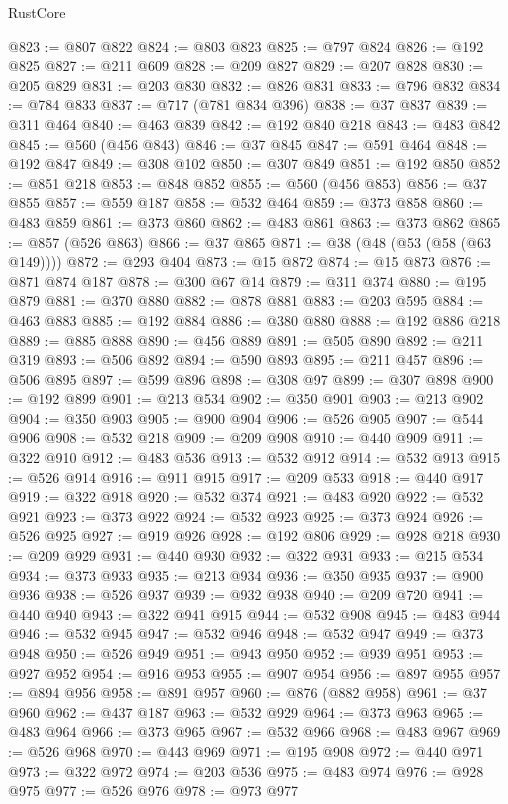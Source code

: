 \begin{lexlean}{RustCore}
\begin{coremodule}
@823 := @807 @822
@824 := @803 @823
@825 := @797 @824
@826 := @192 @825
@827 := @211 @609
@828 := @209 @827
@829 := @207 @828
@830 := @205 @829
@831 := @203 @830
@832 := @826 @831
@833 := @796 @832
@834 := @784 @833
@837 := @717 (@781 @834 @396)
@838 := @37 @837
@839 := @311 @464
@840 := @463 @839
@842 := @192 @840 @218
@843 := @483 @842
@845 := @560 (@456 @843)
@846 := @37 @845
@847 := @591 @464
@848 := @192 @847
@849 := @308 @102
@850 := @307 @849
@851 := @192 @850
@852 := @851 @218
@853 := @848 @852
@855 := @560 (@456 @853)
@856 := @37 @855
@857 := @559 @187
@858 := @532 @464
@859 := @373 @858
@860 := @483 @859
@861 := @373 @860
@862 := @483 @861
@863 := @373 @862
@865 := @857 (@526 @863)
@866 := @37 @865
@871 := @38 (@48 (@53 (@58 (@63 @149))))
@872 := @293 @404
@873 := @15 @872
@874 := @15 @873
@876 := @871 @874 @187
@878 := @300 @67 @14
@879 := @311 @374
@880 := @195 @879
@881 := @370 @880
@882 := @878 @881
@883 := @203 @595
@884 := @463 @883
@885 := @192 @884
@886 := @380 @880
@888 := @192 @886 @218
@889 := @885 @888
@890 := @456 @889
@891 := @505 @890
@892 := @211 @319
@893 := @506 @892
@894 := @590 @893
@895 := @211 @457
@896 := @506 @895
@897 := @599 @896
@898 := @308 @97
@899 := @307 @898
@900 := @192 @899
@901 := @213 @534
@902 := @350 @901
@903 := @213 @902
@904 := @350 @903
@905 := @900 @904
@906 := @526 @905
@907 := @544 @906
@908 := @532 @218
@909 := @209 @908
@910 := @440 @909
@911 := @322 @910
@912 := @483 @536
@913 := @532 @912
@914 := @532 @913
@915 := @526 @914
@916 := @911 @915
@917 := @209 @533
@918 := @440 @917
@919 := @322 @918
@920 := @532 @374
@921 := @483 @920
@922 := @532 @921
@923 := @373 @922
@924 := @532 @923
@925 := @373 @924
@926 := @526 @925
@927 := @919 @926
@928 := @192 @806
@929 := @928 @218
@930 := @209 @929
@931 := @440 @930
@932 := @322 @931
@933 := @215 @534
@934 := @373 @933
@935 := @213 @934
@936 := @350 @935
@937 := @900 @936
@938 := @526 @937
@939 := @932 @938
@940 := @209 @720
@941 := @440 @940
@943 := @322 @941 @915
@944 := @532 @908
@945 := @483 @944
@946 := @532 @945
@947 := @532 @946
@948 := @532 @947
@949 := @373 @948
@950 := @526 @949
@951 := @943 @950
@952 := @939 @951
@953 := @927 @952
@954 := @916 @953
@955 := @907 @954
@956 := @897 @955
@957 := @894 @956
@958 := @891 @957
@960 := @876 (@882 @958)
@961 := @37 @960
@962 := @437 @187
@963 := @532 @929
@964 := @373 @963
@965 := @483 @964
@966 := @373 @965
@967 := @532 @966
@968 := @483 @967
@969 := @526 @968
@970 := @443 @969
@971 := @195 @908
@972 := @440 @971
@973 := @322 @972
@974 := @203 @536
@975 := @483 @974
@976 := @928 @975
@977 := @526 @976
@978 := @973 @977

\end{coremodule}
\end{lexlean}
